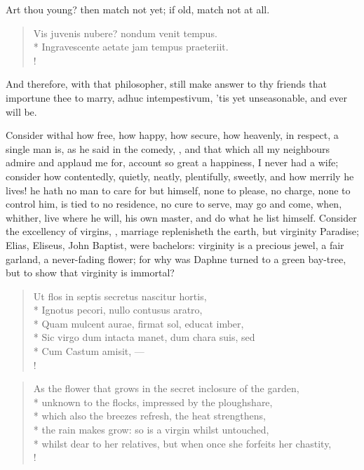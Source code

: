 Art thou young? then match not yet; if old, match not at all.

\begin{latin}
\begin{verse}%
Vis juvenis nubere? nondum venit tempus.\\*
Ingravescente aetate jam tempus praeteriit.\\!
\end{verse}%
\end{latin}

And therefore, with that philosopher, still make answer to thy friends
that importune thee to marry, adhuc intempestivum, 'tis yet
unseasonable, and ever will be.

Consider withal how free, how happy, how secure, how heavenly, in
respect, a single man is, as he said in the comedy, , and that which all my
neighbours admire and applaud me for, account so great a happiness, I
never had a wife; consider how contentedly, quietly, neatly,
plentifully, sweetly, and how merrily he lives! he hath no man to care
for but himself, none to please, no charge, none to control him, is
tied to no residence, no cure to serve, may go and come, when, whither,
live where he will, his own master, and do what he list himself.
Consider the excellency of virgins,  ,
marriage replenisheth the earth, but virginity Paradise; Elias,
Eliseus, John Baptist, were bachelors: virginity is a precious jewel, a
fair garland, a never-fading flower; for why was Daphne turned to
a green bay-tree, but to show that virginity is immortal?

\begin{latin}
\begin{verse}%
Ut flos in septis secretus nascitur hortis,\\*
Ignotus pecori, nullo contusus aratro,\\*
Quam mulcent aurae, firmat sol, educat imber, \etc{}\\*
Sic virgo dum intacta manet, dum chara suis, sed\\*
Cum Castum amisit, \etc{}---\\!
\end{verse}%
\end{latin}
\translationrule%
\begin{verse}%
As the flower that grows in the secret inclosure of the garden,\\*
unknown to the flocks, impressed by the ploughshare,\\*
which also the breezes refresh, the heat strengthens,\\*
the rain makes grow: so is a virgin whilst untouched,\\*
whilst dear to her relatives, but when once she forfeits her chastity, \etc{}\\!
\end{verse}%
%


